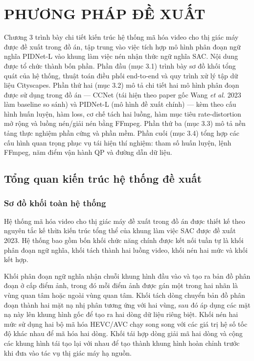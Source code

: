 \chapter{PHƯƠNG PHÁP ĐỀ XUẤT}
\label{chap:phuong-phap}
 
Chương 3 trình bày chi tiết kiến trúc hệ thống mã hóa video cho thị giác máy được đề xuất trong đồ án, tập trung vào việc tích hợp mô hình phân đoạn ngữ nghĩa PIDNet-L vào khung làm việc nén nhận thức ngữ nghĩa SAC. Nội dung được tổ chức thành bốn phần. Phần đầu (mục 3.1) trình bày sơ đồ khối tổng quát của hệ thống, thuật toán điều phối end-to-end và quy trình xử lý tập dữ liệu Cityscapes. Phần thứ hai (mục 3.2) mô tả chi tiết hai mô hình phân đoạn được sử dụng trong đồ án --- CCNet (tái hiện theo paper gốc Wang \textit{et al.} 2023 làm baseline so sánh) và PIDNet-L (mô hình đề xuất chính) --- kèm theo cấu hình huấn luyện, hàm loss, cơ chế tách hai luồng, hàm mục tiêu rate-distortion mở rộng và luồng nén/giải nén bằng FFmpeg. Phần thứ ba (mục 3.3) mô tả nền tảng thực nghiệm phần cứng và phần mềm. Phần cuối (mục 3.4) tổng hợp các cấu hình quan trọng phục vụ tái hiện thí nghiệm: tham số huấn luyện, lệnh FFmpeg, năm điểm vận hành QP và đường dẫn dữ liệu.
 
\section{Tổng quan kiến trúc hệ thống đề xuất}
\label{sec:tong-quan-kien-truc}
 
\subsection{Sơ đồ khối toàn hệ thống}
\label{subsec:so-do-khoi-ht}
 
Hệ thống mã hóa video cho thị giác máy đề xuất trong đồ án được thiết kế theo nguyên tắc kế thừa kiến trúc tổng thể của khung làm việc SAC được đề xuất 2023. Hệ thống bao gồm bốn khối chức năng chính được kết nối tuần tự là khối phân đoạn ngữ nghĩa, khối tách thành hai luồng video, khối nén hai mức và khối kết hợp.
 



Khối phân đoạn ngữ nghĩa nhận chuỗi khung hình đầu vào và tạo ra bản đồ phân đoạn ở cấp điểm ảnh, trong đó mỗi điểm ảnh được gán một trong hai nhãn là vùng quan tâm hoặc ngoài vùng quan tâm. Khối tách dòng chuyển bản đồ phân đoạn thành hai mặt nạ nhị phân tương ứng với hai vùng, sau đó áp dụng các mặt nạ này lên khung hình gốc để tạo ra hai dòng dữ liệu riêng biệt. Khối nén hai mức sử dụng hai bộ mã hóa HEVC/AVC chạy song song với các giá trị hệ số tốc độ khác nhau để mã hóa hai dòng. Khối tái hợp dòng giải mã hai dòng và cộng các khung hình tái tạo lại với nhau để tạo thành khung hình hoàn chỉnh trước khi đưa vào tác vụ thị giác máy hạ nguồn.

